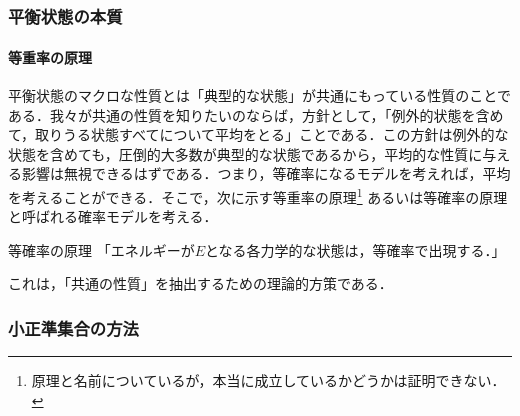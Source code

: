 \part{}
\section{平衡状態の本質}
\subsection{等重率の原理}
平衡状態のマクロな性質とは「典型的な状態」が共通にもっている性質のことである．我々が共通の性質を知りたいのならば，方針として，「例外的状態を含めて，取りうる状態すべてについて平均をとる」ことである．この方針は例外的な状態を含めても，圧倒的大多数が典型的な状態であるから，平均的な性質に与える影響は無視できるはずである．つまり，等確率になるモデルを考えれば，平均を考えることができる．そこで，次に示す等重率の原理\footnote{%
原理と名前についているが，本当に成立しているかどうかは証明できない．
}
あるいは等確率の原理と呼ばれる確率モデルを考える．
　\begin{itembox}[l]{等確率の原理}
「エネルギーが$E$となる各力学的な状態は，等確率で出現する．」
\end{itembox}
これは，「共通の性質」を抽出するための理論的方策である．
\section{小正準集合の方法}
